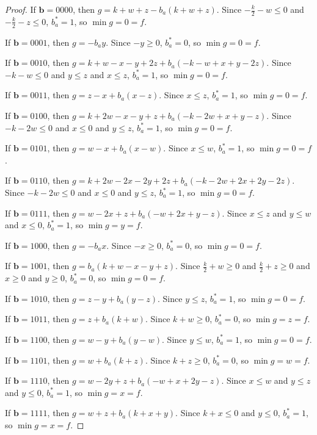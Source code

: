 \documentclass[11pt]{scrartcl}
\newcommand{\vc}[1]{\boldsymbol{#1}}
\begin{document}
\begin{proof}
	If $\vc b = 0000$, then $g = k + w + z - b_a(k + w + z)$. Since $-\frac{k}{2} - w \le 0$ and $-\frac{k}{2} - z \le 0$, $b_a^* = 1$, so $\min g = 0 = f$.

If $\vc b = 0001$, then $g = -b_ay$. Since $-y \ge 0$, $b_a^* = 0$, so $\min g = 0 = f$.

If $\vc b = 0010$, then $g = k + w - x - y + 2z + b_a(-k - w + x + y - 2z)$. Since $-k - w\le 0$ and $y \le z$ and $x \le z$, $b_a^* = 1$, so $\min g = 0 = f$.

If $\vc b = 0011$, then $g = z - x + b_a(x - z)$. Since $x \le z$, $b_a^* = 1$, so $\min g = 0 = f$.

If $\vc b = 0100$, then $g = k + 2w - x - y + z + b_a(-k - 2w + x + y - z)$. Since $-k - 2w \le 0$ and $x \le 0$ and $y \le z$, $b_a^* = 1$, so $\min g = 0 = f$.

If $\vc b = 0101$, then $g = w - x + b_a(x - w)$. Since $x \le w$, $b_a^* = 1$, so $\min g = 0 = f$. 

If $\vc b = 0110$, then $g = k + 2w - 2x - 2y + 2z + b_a(-k - 2w +2x + 2y - 2z)$. Since $-k - 2w \le 0$ and $x \le 0$ and $y \le z$, $b_a^* = 1$, so $\min g = 0 = f$.


If $\vc b = 0111$, then $g = w - 2x + z + b_a (-w + 2x + y - z)$. Since $x \le z$ and $y \le w$ and $x \le 0$, $b_a^* = 1$, so $\min g = y = f$.

If $\vc b = 1000$, then $g = -b_ax$. Since $-x \ge 0$, $b_a^* = 0$, so $\min g = 0 = f$.

If $\vc b = 1001$, then $g = b_a(k + w - x - y + z)$. Since $\frac{k}{2} + w \ge 0 $ and $\frac{k}{2} + z \ge 0$ and $x \ge 0 $ and $y \ge 0$, $b_a^* = 0$, 
so $\min g = 0 = f$.

If $\vc b = 1010$, then $g = z - y + b_a(y - z)$. Since $y \le z$, $b_a^* = 1$, so $\min g = 0  = f$.

If $\vc b = 1011$, then $g = z + b_a(k + w)$. Since $k + w \ge 0$, $b_a^* = 0$, so $\min g = z = f$.

If $\vc b = 1100$, then $g = w - y + b_a(y -w)$. Since $y \le w$, $b_a^* = 1$, so $\min g = 0 = f$. 

If $\vc b = 1101$, then $g = w + b_a(k + z)$. Since $k+z \ge 0$, $b_a^* = 0$, so $\min g = w = f$.

If $\vc b = 1110$, then $g = w - 2y + z + b_a(-w + x + 2y - z)$. Since $x \le w$ and $y \le z$ and $y \le 0$, $b_a^* = 1$, so $\min g = x = f$.

If $\vc b = 1111$, then $g = w + z + b_a(k + x + y)$. Since $k + x \le 0$ and $y \le 0 $, $b_a^* = 1$, so $\min g = x = f$.

\end{proof}	
\end{document}
